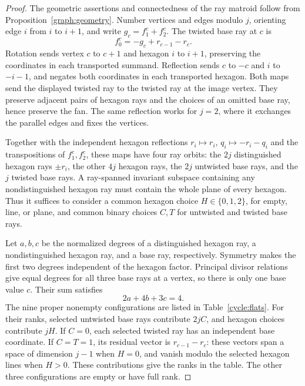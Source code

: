 \begin{proof}
The geometric assertions and connectedness of the ray matroid follow
from Proposition~\ref{graph:geometry}. Number vertices and edges modulo
$j$, orienting edge $i$ from $i$ to $i+1$, and write
$g_c=f^c_1+f^c_2$. The twisted base ray at $c$ is
\[
 f^c_0=-g_c+r_{c-1}-r_c.
\]
Rotation sends vertex $c$ to $c+1$ and hexagon $i$ to $i+1$, preserving
the coordinates in each transported summand. Reflection sends $c$ to
$-c$ and $i$ to $-i-1$, and negates both coordinates in each transported
hexagon. Both maps send the displayed twisted ray to the twisted ray
at the image vertex. They preserve adjacent pairs of hexagon rays and
the choices of an omitted base ray, hence preserve the fan. The same
reflection works for $j=2$, where it exchanges the parallel edges and
fixes the vertices.

Together with the independent hexagon reflections
$r_i\mapsto r_i$, $q_i\mapsto-r_i-q_i$ and the transpositions of
$f^c_1,f^c_2$, these maps have four ray orbits: the $2j$ distinguished
hexagon rays $\pm r_i$, the other $4j$ hexagon rays, the $2j$ untwisted
base rays, and the $j$ twisted base rays. A ray-spanned invariant
subspace containing any nondistinguished hexagon ray must contain the
whole plane of every hexagon. Thus it suffices to consider a common
hexagon choice $H\in\{0,1,2\}$, for empty, line, or plane, and common
binary choices $C,T$ for untwisted and twisted base rays.

Let $a,b,c$ be the normalized degrees of a distinguished hexagon ray,
a nondistinguished hexagon ray, and a base ray, respectively. Symmetry
makes the first two degrees independent of the hexagon factor. Principal
divisor relations give equal degrees for all three base rays at a vertex, so
there is only one base value $c$. Their sum satisfies
\begin{equation}\label{cycle:weightsum}
 2a+4b+3c=4.
\end{equation}
The nine proper nonempty configurations are listed in
Table~\ref{cycle:flats}. For their ranks, selected untwisted base rays
contribute $2jC$, and hexagon choices contribute $jH$. If $C=0$, each
selected twisted ray has an independent base coordinate. If $C=T=1$,
its residual vector is $r_{c-1}-r_c$: these vectors span a space of
dimension $j-1$ when $H=0$, and vanish modulo the selected hexagon
lines when $H>0$. These contributions give the ranks in the table. The
other three configurations are empty or have full rank.


\end{proof}

